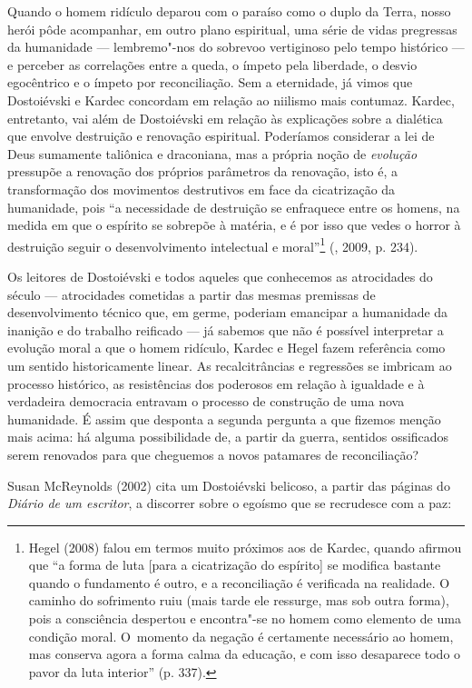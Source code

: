 Quando o homem ridículo deparou com o paraíso como o duplo da Terra,
nosso herói pôde acompanhar, em outro plano espiritual, uma série de
vidas pregressas da humanidade --- lembremo"-nos do sobrevoo vertiginoso
pelo tempo histórico --- e perceber as correlações entre a queda, o
ímpeto pela liberdade, o desvio egocêntrico e o ímpeto por
reconciliação. Sem a eternidade, já vimos que Dostoiévski e Kardec
concordam em relação ao niilismo mais contumaz. Kardec, entretanto, vai
além de Dostoiévski em relação às explicações sobre a dialética que
envolve destruição e renovação espiritual. Poderíamos considerar a lei
de Deus sumamente taliônica e draconiana, mas a própria noção de
\emph{evolução} pressupõe a renovação dos próprios parâmetros da
renovação, isto é, a transformação dos movimentos destrutivos em face da
cicatrização da humanidade, pois ``a necessidade de destruição se
enfraquece entre os homens, na medida em que o espírito se sobrepõe à
matéria, e é por isso que vedes o horror à destruição seguir o
desenvolvimento intelectual e moral''\footnote{Hegel (2008) falou em
  termos muito próximos aos de Kardec, quando afirmou que ``a forma de
  luta {[}para a cicatrização do espírito{]} se modifica bastante quando
  o fundamento é outro, e a reconciliação é verificada na realidade. O
  caminho do sofrimento ruiu (mais tarde ele ressurge, mas sob outra
  forma), pois a consciência despertou e encontra"-se no homem como
  elemento de uma condição moral. O~momento da negação é certamente
  necessário ao homem, mas conserva agora a forma calma da educação, e
  com isso desaparece todo o pavor da luta interior'' (p. 337).}
(, 2009, p. 234).

Os leitores de Dostoiévski e todos aqueles que conhecemos as atrocidades
do século  --- atrocidades cometidas a partir das mesmas premissas de
desenvolvimento técnico que, em germe, poderiam emancipar a humanidade
da inanição e do trabalho reificado --- já sabemos que não é possível
interpretar a evolução moral a que o homem ridículo, Kardec e Hegel
fazem referência como um sentido historicamente linear. As
recalcitrâncias e regressões se imbricam ao processo histórico, as
resistências dos poderosos em relação à igualdade e à verdadeira
democracia entravam o processo de construção de uma nova humanidade. É
assim que desponta a segunda pergunta a que fizemos menção mais acima:
há alguma possibilidade de, a partir da guerra, sentidos ossificados
serem renovados para que cheguemos a novos patamares de reconciliação?

Susan McReynolds (2002) cita um Dostoiévski belicoso, a partir das
páginas do \emph{Diário de um escritor}, a discorrer sobre o egoísmo que
se recrudesce com a paz:

